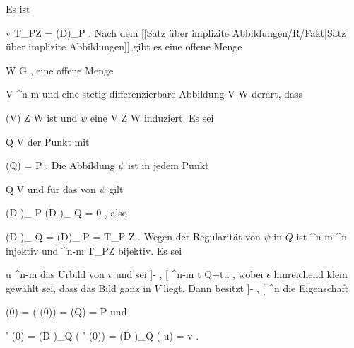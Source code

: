 {

Es ist

\mavergleichskette
{\vergleichskette
{v
}
{ \in }{ T_PZ
}
{ = }{   \left(D\varphi\right)_{P}
}
{    }{
}
{   }{
}
}
{}{}{.}
Nach
dem [[Satz über implizite Abbildungen/R/Fakt|Satz über implizite Abbildungen]]
gibt es eine offene Menge

 {}
 {W \subseteq G} {}
 {} {} {} {,}
eine offene Menge

\mavergleichskette
{\vergleichskette
{ V
}
{ \subseteq }{ \R^{n-m}
}
{  }{
}
{    }{
}
{   }{
}
}
{}{}{}
und eine stetig differenzierbare Abbildung
\maabbdisp {\psi} { V } { W
} {}
derart, dass

\mavergleichskette
{\vergleichskette
{ \psi(V)
}
{ \subseteq }{ Z \cap W
}
{  }{
}
{    }{
}
{   }{
}
}
{}{}{}
ist und $\psi$ eine
\maabbdisp {\psi} { V } { Z \cap W
} {}
induziert. Es sei

\mavergleichskette
{\vergleichskette
{ Q
}
{ \in }{ V
}
{  }{
}
{    }{
}
{   }{
}
}
{}{}{}
der Punkt mit

\mavergleichskette
{\vergleichskette
{ \psi(Q)
}
{ = }{ P
}
{  }{
}
{    }{
}
{   }{
}
}
{}{}{.}
Die Abbildung $\psi$ ist in jedem Punkt

\mavergleichskette
{\vergleichskette
{ Q
}
{ \in }{ V
}
{  }{
}
{    }{
}
{   }{
}
}
{}{}{}
und für das
von $\psi$ gilt

\mavergleichskettedisp
{\vergleichskette
{ \left(D \varphi \right)_{ P }  \circ \left(D \psi \right)_{ Q }
}
{ =} { 0
}
{ } {
}
{ } {
}
{ } {
}
}
{}{}{,}
also

\mavergleichskettedisp
{\vergleichskette
{   \left(D \psi\right)_{ Q }
}
{ =} {   \left(D\varphi \right)_{ P }
}
{ =} { T_P Z
}
{ } {
}
{ } {
}
}
{}{}{.}
Wegen der Regularität von $\psi$ in $Q$ ist
 { \R^{n-m}  } { \R^n
} {}
injektiv und
 { \R^{n-m}  } { T_PZ
} {}
bijektiv. Es sei

\mavergleichskette
{\vergleichskette
{ u
}
{ \in }{ \R^{n-m}
}
{  }{
}
{    }{
}
{   }{
}
}
{}{}{}
das Urbild von $v$ und sei
\maabbeledisp {\theta} { ]- \epsilon, \epsilon[ } { \R^{n-m}
} { t } { Q+tu
} {,}
wobei $\epsilon$ hinreichend klein gewählt sei, dass das Bild ganz in $V$ liegt. Dann besitzt
\maabbdisp {\gamma = \psi \circ \theta} { ]- \epsilon, \epsilon[  } { \R^n
} {}
die Eigenschaft

\mavergleichskettedisp
{\vergleichskette
{ \gamma(0)
}
{ =} { \psi( \theta (0))
}
{ =} { \psi(Q)
}
{ =} { P
}
{ } {
}
}
{}{}{}
und

\mavergleichskettedisp
{\vergleichskette
{ \gamma' (0)
}
{ =} { \left(D \psi\right)_{Q} ( \theta' (0))
}
{ =} { \left(D \psi\right)_{Q} ( u)
}
{ =} { v
}
{ } {
}
}
{}{}{.}

 }

